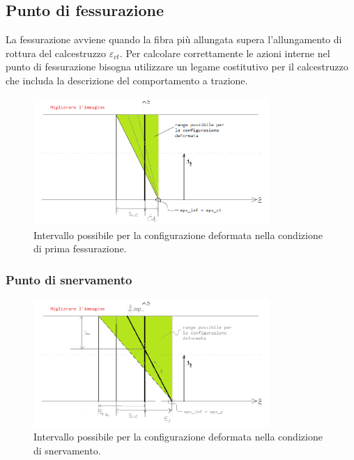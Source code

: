 \documentclass[10pt]{article}
\begin{document}
\subsection{Punto di fessurazione}

La fessurazione avviene quando la fibra più allungata supera l'allungamento di rottura del calcestruzzo $\varepsilon_{ct}$. Per calcolare correttamente le azioni interne nel punto di fessurazione bisogna utilizzare un legame costitutivo per il calcestruzzo che includa la descrizione del comportamento a trazione.

\begin{figure}[H]
\centering
\includegraphics[width=0.8\textwidth]{img/punto_fessurazione.png}
\caption{\footnotesize Intervallo possibile per la configurazione deformata nella condizione di prima fessurazione.}
\end{figure}


\subsubsection{Punto di snervamento}

\begin{figure}[H]
\centering
\includegraphics[width=0.8\textwidth]{img/punto_snervamento.png}
\caption{\footnotesize Intervallo possibile per la configurazione deformata nella condizione di snervamento.}
\end{figure}
\end{document}

